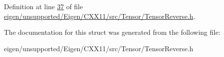 Definition at line \hyperlink{eigen_2unsupported_2_eigen_2_c_x_x11_2src_2_tensor_2_tensor_reverse_8h_source_l00037}{37} of file \hyperlink{eigen_2unsupported_2_eigen_2_c_x_x11_2src_2_tensor_2_tensor_reverse_8h_source}{eigen/unsupported/\+Eigen/\+C\+X\+X11/src/\+Tensor/\+Tensor\+Reverse.\+h}.



The documentation for this struct was generated from the following file\+:\begin{DoxyCompactItemize}
\item 
eigen/unsupported/\+Eigen/\+C\+X\+X11/src/\+Tensor/\+Tensor\+Reverse.\+h\end{DoxyCompactItemize}
